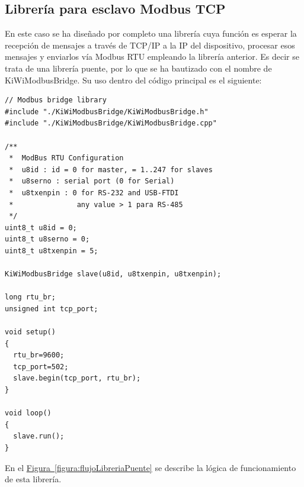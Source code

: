 \subsection{Librería para esclavo Modbus TCP}
\label{subsec:esclavoTCPkiwi}

En este caso se ha diseñado por completo una librería cuya función es esperar la recepción de mensajes a través de TCP/IP a la IP del dispositivo, procesar esos mensajes y enviarlos vía Modbus RTU empleando la librería anterior. Es decir se trata de una librería puente, por lo que se ha bautizado con el nombre de KiWiModbusBridge. Su uso dentro del código principal es el siguiente:

\begin{lstlisting}
// Modbus bridge library
#include "./KiWiModbusBridge/KiWiModbusBridge.h"
#include "./KiWiModbusBridge/KiWiModbusBridge.cpp"

/**
 *  ModBus RTU Configuration
 *  u8id : id = 0 for master, = 1..247 for slaves
 *  u8serno : serial port (0 for Serial)
 *  u8txenpin : 0 for RS-232 and USB-FTDI 
 *               any value > 1 para RS-485
 */
uint8_t u8id = 0; 
uint8_t u8serno = 0;   
uint8_t u8txenpin = 5;  

KiWiModbusBridge slave(u8id, u8txenpin, u8txenpin);

long rtu_br;
unsigned int tcp_port;

void setup()
{
  rtu_br=9600;
  tcp_port=502;
  slave.begin(tcp_port, rtu_br);
}

void loop()
{
  slave.run();
}

\end{lstlisting}

En el \hyperref[figura:flujoLibreriaPuente]{Figura~\ref{figura:flujoLibreriaPuente}} se describe la lógica de funcionamiento de esta librería.


